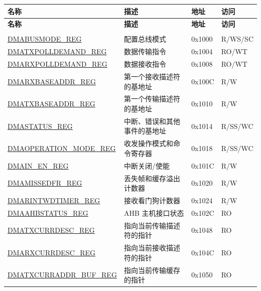 \begin{longtable}{ |m{6cm} |m{5.3cm} | m{2cm} | m{2.2cm} | }
\hline\rowcolor{lightgray}
\textbf{名称} & \textbf{描述} &  \textbf{地址} & \textbf{访问} \\ \hline
\endfirsthead
\hline
\rowcolor{lightgray}
\textbf{名称} & \textbf{描述} &  \textbf{地址} & \textbf{访问} \\ \hline
\endhead
\hline
\endfoot
\hline
\endlastfoot

\multicolumn{4}{|l|}{\textbf{DMA 配置和控制寄存器}} \\ \hline
\hyperref[regdesc:DMABUSMODEREG]{DMABUSMODE\_REG} & 配置总线模式 & 0x1000 & R/WS/SC \\ \hline
\hyperref[regdesc:DMATXPOLLDEMANDREG]{DMATXPOLLDEMAND\_REG} &  数据传输指令& 0x1004 & RO/WT \\ \hline
\hyperref[regdesc:DMARXPOLLDEMANDREG]{DMARXPOLLDEMAND\_REG} & 数据接收指令& 0x1008 & RO/WT \\ \hline
\hyperref[regdesc:DMARXBASEADDRREG]{DMARXBASEADDR\_REG} &  第一个接收描述符的基地址 & 0x100C & R/W \\ \hline
\hyperref[regdesc:DMATXBASEADDRREG]{DMATXBASEADDR\_REG} &  第一个传输描述符的基地址& 0x1010 & R/W \\ \hline
\hyperref[regdesc:DMASTATUSREG]{DMASTATUS\_REG} & 中断、错误和其他事件的基地址 & 0x1014 & R/SS/WC \\ \hline
\hyperref[regdesc:DMAOPERATIONMODEREG]{DMAOPERATION\_MODE\_REG} & 收发操作模式和命令寄存器 & 0x1018 & R/SS/WC \\ \hline
\hyperref[regdesc:DMAINENREG]{DMAIN\_EN\_REG} & 中断关闭/使能 & 0x101C & R/W \\ \hline
\hyperref[regdesc:DMAMISSEDFRREG]{DMAMISSEDFR\_REG} & 丢失帧和缓存溢出计数器
& 0x1020 & R/W \\ \hline
\hyperref[regdesc:DMARINTWDTIMERREG]{DMARINTWDTIMER\_REG} &  接收看门狗计数器 & 0x1024 & R/W \\ \hline
\hyperref[regdesc:DMAHBSTATUSREG]{DMAAHBSTATUS\_REG} &  AHB 主机接口状态 & 0x102C & RO \\ \hline
\hyperref[regdesc:DMATXCURRDESCREG]{DMATXCURRDESC\_REG} &  指向当前传输描述符的指针 & 0x1048 & RO \\ \hline
\hyperref[regdesc:DMARXCURRDESCREG]{DMARXCURRDESC\_REG} & 指向当前接收描述符的指针& 0x104C & RO \\ \hline
\hyperref[regdesc:DMATXCURRADDRBUFREG]{DMATXCURRADDR\_BUF\_REG} & 指向当前传输缓存的指针& 0x1050 & RO \\ \hline

\end{longtable}
